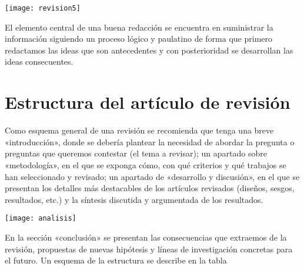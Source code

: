  \begin{marginfigure}[-2.2cm]%
	\texttt{[image: revision5]}
\end{marginfigure}



El elemento central de una buena redacción se encuentra en suministrar la información siguiendo un proceso lógico y paulatino de forma que primero redactamos las ideas que son antecedentes y con posterioridad se desarrollan las ideas consecuentes.

\section{Estructura del artículo de revisión}


Como esquema general de una revisión se recomienda que tenga una breve «introducción», donde se debería plantear la necesidad de abordar la pregunta o preguntas que queremos contestar (el tema a revisar); un apartado sobre «metodología», en el que se exponga cómo, con qué criterios y qué trabajos se han seleccionado y revisado; un apartado de «desarrollo y discusión», en el que se presentan los detalles más destacables de los artículos revisados (diseños, sesgos, resultados, etc.) y la síntesis discutida y argumentada de los resultados.

 \begin{marginfigure}[1.2cm]%
	\texttt{[image: analisis]}
\end{marginfigure}

 

En la sección «conclusión» se presentan las consecuencias que extraemos de la revisión, propuestas de nuevas hipótesis y líneas de investigación concretas para el futuro.  Un esquema de la estructura se describe en la  tabla 



